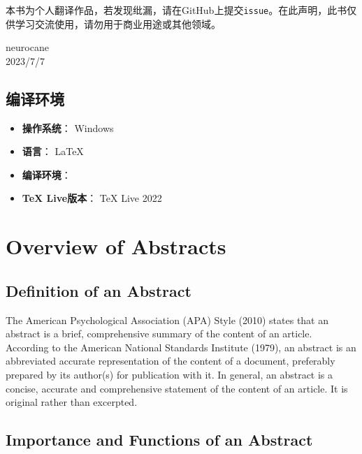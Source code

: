 \documentclass{ctexbook}
\begin{document}
本书为个人翻译作品，若发现纰漏，请在GitHub上提交\verb|issue|。在此声明，此书仅供学习交流使用，请勿用于商业用途或其他领域。

\vfill

\begin{flushright}
    neurocane\\
    2023/7/7
\end{flushright}

\newpage

\section*{编译环境}

\begin{itemize}
    \item \textbf{操作系统}： Windows
    \item \textbf{语言}： \LaTeX
    \item \textbf{编译环境}： \XeLaTeX
    \item \textbf{TeX Live版本}： TeX Live 2022
\end{itemize}

\tableofcontents

\mainmatter


\chapter{Overview of Abstracts}\label{chapter1}
\section{Definition of an Abstract}

The American Psychological Association (APA) Style (2010) states that an abstract is a brief, comprehensive summary of the content of an article. According to the American National Standards Institute (1979), an abstract is an abbreviated accurate representation of the content of a document, preferably prepared by its author(s) for publication with it. In general, an abstract is a concise, accurate and comprehensive statement of the content of an article. It is original rather than excerpted.

\section{Importance and Functions of an Abstract}
\end{document}

